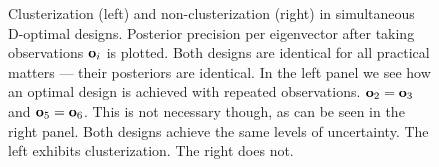 \begin{figure}
  \caption{Clusterization (left) and non-clusterization (right) in
    simultaneous D-optimal designs. Posterior precision per
    eigenvector after taking observations $\mathbf{o}_i$ is plotted. Both
    designs are identical for all practical matters --- their
    posteriors are identical. In the left panel we see how an optimal
    design is achieved with repeated observations. $\mathbf{o}_2 = \mathbf{o}_3$
    and $\mathbf{o}_5 = \mathbf{o}_6$. This is not necessary though, as can be
    seen in the right panel. Both designs achieve the same levels of
    uncertainty. The left exhibits clusterization. The right does not.}
  \label{fig:clusterization}
\end{figure}
























